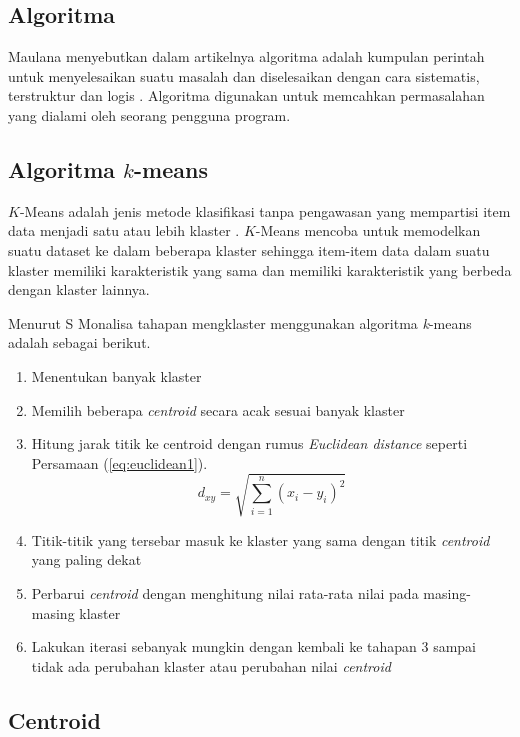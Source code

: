 \subsection{Algoritma}

Maulana menyebutkan dalam artikelnya algoritma adalah kumpulan perintah untuk menyelesaikan suatu masalah dan diselesaikan dengan cara sistematis, terstruktur dan logis \cite{maulana2017pembelajaran}. Algoritma digunakan untuk memcahkan permasalahan yang dialami oleh seorang pengguna program.

\subsection{Algoritma $k$-means}

$K$-Means adalah jenis metode klasifikasi tanpa pengawasan yang mempartisi item data menjadi satu atau lebih klaster \cite{agusta2007k}. $K$-Means mencoba untuk memodelkan suatu dataset ke dalam beberapa klaster sehingga item-item data dalam suatu klaster memiliki karakteristik yang sama dan memiliki karakteristik yang berbeda dengan klaster lainnya.

Menurut S Monalisa \cite{monalisa2018klasterisasi} tahapan mengklaster menggunakan algoritma \textit{k}-means adalah sebagai berikut.

\begin{enumerate}
	\item Menentukan banyak klaster
	\item Memilih beberapa \textit{centroid} secara acak sesuai banyak klaster
	\item Hitung jarak titik ke centroid dengan rumus \textit{Euclidean distance} seperti Persamaan (\ref{eq:euclidean1}).
	\begin{equation}
	d_{xy}=\sqrt{\sum_{i=1}^{n}(x_i-y_i)^{2}}
	\label{eq:euclidean1}
	\end{equation}
	\item Titik-titik yang tersebar masuk ke klaster yang sama dengan titik \textit{centroid} yang paling dekat
	\item Perbarui \textit{centroid} dengan menghitung nilai rata-rata nilai pada masing-masing klaster
	\item Lakukan iterasi sebanyak mungkin dengan kembali ke tahapan 3 sampai tidak ada perubahan klaster atau perubahan nilai \textit{centroid}
\end{enumerate}

\subsection{Centroid}

